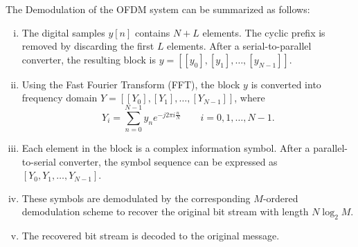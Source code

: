 The Demodulation of the OFDM system can be summarized as follows:
\begin{enumerate}[(i)]
    \item The digital samples $y[n]$ contains $N+L$ elements. The cyclic prefix is removed by discarding the first $L$ elements. After a serial-to-parallel converter, the resulting block is $y = [[y_0], [y_1], \ldots, [y_{N-1}]]$.
    \item Using the Fast Fourier Transform (FFT), the block $y$ is converted into frequency domain $Y = [[Y_{0}], [Y_{1}], \ldots, [Y_{N-1}]]$, where
    \[ Y_i = \sum_{n=0}^{N-1}y_n e^{-j2\pi i\frac{n}{N}} \qquad i=0,1,\ldots,N-1. \]
    \item Each element in the block is a complex information symbol. After a parallel-to-serial converter, the symbol sequence can be expressed as $[Y_{0}, Y_{1}, \ldots, Y_{N-1}]$.
    \item These symbols are demodulated by the corresponding $M$-ordered demodulation scheme to recover the original bit stream with length $N\log_2M$.
    \item The recovered bit stream is decoded to the original message.
\end{enumerate}